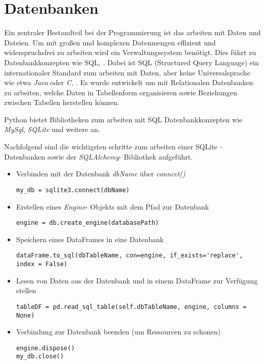 \chapter{Datenbanken}

Ein zentraler Bestandteil bei der Programmierung ist das arbeiten mit Daten und Dateien. Um mit großen und komplexen Datenmengen effizient und widerspruchsfrei zu arbeiten wird ein Verwaltungssystem benötigt. Dies führt zu Datenbankkonzepten wie SQL, \cite{Steyer:2018}.
Dabei ist SQL (Structured Query Language) ein internationaler Standard zum arbeiten mit Daten, aber keine Universalsprache wie etwa \textit{Java} oder \textit{C}, \cite{Taylor:2023}. Es wurde entwickelt um mit Relationalen Datenbanken zu arbeiten, welche Daten in Tabellenform organisieren sowie Beziehungen zwischen Tabellen herstellen können.

Python bietet Bibliotheken zum arbeiten mit SQL Datenbankkonzepten wie \textit{MySql}, \textit{SQLite} und weitere an.

Nachfolgend sind die wichtigsten schritte zum arbeiten einer SQLite - Datenbanken sowie der \textit{SQLAlchemy}- Bibliothek aufgeführt.
\begin{itemize}
	\itemsep0pt
	\item Verbinden mit der Datenbank \textit{dbName} über \textit{conncet()}
	\begin{lstlisting}
my_db = sqlite3.connect(dbName)
	\end{lstlisting}
	\item Erstellen eines \textit{Engine}- Objekts mit dem Pfad zur Datenbank 
	\begin{lstlisting}
engine = db.create_engine(databasePath)
	\end{lstlisting}
	\item Speichern eines DataFrames in eine Datenbank
	\begin{lstlisting}
dataFrame.to_sql(dbTableName, con=engine, if_exists='replace', index = False)
	\end{lstlisting}
	\item Lesen von Daten aus der Datenbank und in einem DataFrame zur Verfügung stellen
	\begin{lstlisting}
tableDF = pd.read_sql_table(self.dbTableName, engine, columns = None)
	\end{lstlisting}
	\item Verbindung zur Datenbank beenden (um Ressourcen zu schonen)
	\begin{lstlisting}
engine.dispose()
my_db.close()
	\end{lstlisting}
	
\end{itemize}